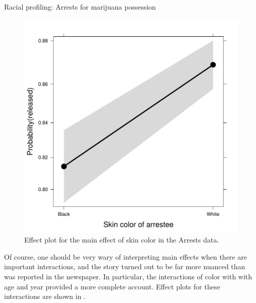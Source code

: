 \documentclass[11pt]{book}\usepackage[]{graphicx}\usepackage[]{color}
\newenvironment{knitrout}{}{} %
\renewenvironment{knitrout}{\small\renewcommand{\baselinestretch}{.85}}{} %
\begin{document}
\begin{Example}[arrests]{Racial profiling: Arrests for marijuana possession}
\begin{knitrout}
\begin{figure}[!htbp]
\centerline{\includegraphics[width=.6\textwidth]{ch07/fig/arrests-eff1-1} }

\caption[Effect plot for the main effect of skin color in the Arrests data]{Effect plot for the main effect of skin color in the Arrests data.\label{fig:arrests-eff1}}
\end{figure}


\end{knitrout}

Of course, one should be very wary of interpreting main effects when there are
important interactions, and the story turned out to be far more nuanced than
was reported in the newspaper.  In particular, the interactions of color with
with age and year provided a more complete account.  Effect plots for these
interactions are shown in .  


\end{Example}
\end{document}
